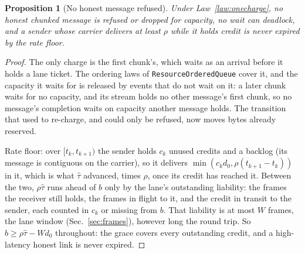 \documentclass[journal]{IEEEtran}
\newtheorem{proposition}{Proposition}
\begin{document}
\begin{proposition}[No honest message refused]\label{prop:noref}
Under Law~\ref{law:onecharge}, no honest chunked message is refused or dropped for capacity, no
wait can deadlock, and a sender whose carrier delivers at least $\rho$ while it holds credit is
never expired by the rate floor.
\end{proposition}
\begin{proof}
The only charge is the first chunk's, which waits as an arrival before it holds a lane ticket.
The ordering laws of \texttt{ResourceOrderedQueue} cover it, and the capacity it waits for is
released by events that do not wait on it: a later chunk waits for no capacity, and its stream
holds no other message's first chunk, so no message's completion waits on capacity another
message holds.  The transition that used to re-charge, and could only be refused, now moves
bytes already reserved.

Rate floor: over $[t_k,t_{k+1})$ the sender holds $c_k$ unused credits and a backlog (its
message is contiguous on the carrier), so it delivers $\min(c_k d_0,\rho(t_{k+1}-t_k))$ in it,
which is what $\hat\tau$ advanced, times $\rho$, once its credit has reached it.  Between the two,
$\rho\hat\tau$ runs ahead of $b$ only by the lane's outstanding liability: the frames the
receiver still holds, the frames in flight to it, and the credit in transit to the sender, each
counted in $c_k$ or missing from $b$.  That liability is at most $W$ frames, the lane window
(Sec.~\ref{sec:frames}), however long the round trip.  So $b\ge\rho\hat\tau-W d_0$ throughout:
the grace covers every outstanding credit, and a high-latency honest link is never expired.
\end{proof}
\end{document}

